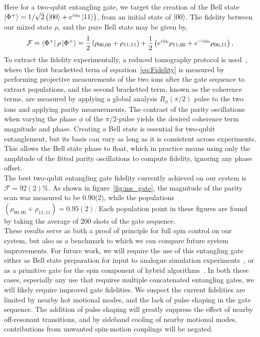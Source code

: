     Here for a two-qubit entangling gate, we target the creation of the Bell
    state $\ket{\Phi^+} = 1/\sqrt{2} \left( \ket{00} +
    e^{i\phi_0}\ket{11} \right)$, from an initial state of $\ket{00}$.
    The fidelity between our mixed state $\rho$, and the pure Bell state may be
    given by,
    \begin{equation}
        \mathcal{F} = \bra{\Phi^+} \rho \ket{\Phi^+} = \frac{1}{2} \left( \rho_{00,00} + \rho_{11,11} \right) + \frac{1}{2}\left( e^{i\phi_0}\rho_{11,00}+e^{-i\phi_0}\rho_{00,11}\right),
        \label{eq:Fidelity}
    \end{equation}
    To extract the fidelity experimentally, a reduced tomography 
    protocol is used~\cite{sackett2000experimental}, where the first bracketted term of
    equation~\ref{eq:Fidelity} is measured by performing projective measurements
    of the two ions after the gate sequence to extract populations, and the second bracketted term,
    known as the coherence terms, are measured by applying a global analysis
    $R_\phi(\pi/2)$ pulse to the two ions and applying parity measurements.  The
    contrast of the parity oscillations when varying the phase $\phi$ of the
    $\pi/2$-pulse yields the desired coherence term magnitude and phase. 
    Creating a Bell state is essential for two-qubit entanglement, but its basis can vary as long as it is consistent across experiments. This allows the Bell state phase to float, which in practice means using only the amplitude of the fitted parity oscillations to compute fidelity, ignoring any phase offset.\\
    The best two-qubit entangling gate fidelity currently achieved on our system is $\mathcal{F}=92(2)\%$. As shown in figure~\ref{fig:ms_gate}, the magnitude of the parity scan was measured to be 0.90(2), while the populations $\left( \rho_{00,00} + \rho_{11,11} \right) = 0.95(2)$. Each population point in these figures are found by taking the average of 200 shots of the gate sequence.\\
    These results serve as both a proof of principle for full spin control on
    our system, but also as a benchmark to which we can compare future system
    improvements.  For future work, we will require the use of this entangling
    gate either as Bell state preparation for input to analogue simulation
    experiments~\cite{bazavan2023synthetic}, or as a primitive gate for the spin component of hybrid
    algorithms~\cite{varona2024towards,brenner2024factoring}.  In both these cases, especially any use that requires
    multiple concatenated entangling gates, we will likely require improved gate
    fidelities. We suspect the current fidelities are limited by nearby hot
    motional modes, and the lack of pulse shaping in the gate sequence. The addition of pulse shaping will greatly suppress 
    the effect of nearby off-resonant transitions, and by sideband cooling of
    nearby motional modes, contributions from unwanted
    spin-motion couplings will be negated.\\
